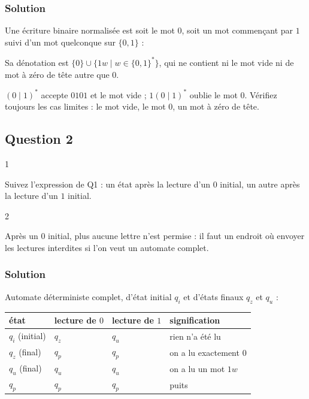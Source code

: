 \documentclass[11pt,a4paper]{article}
\newcommand{\equationajustee}[1]{%
  \sbox{\boiteequation}{$\displaystyle #1$}%
  \ifdim\wd\boiteequation>\linewidth
    \[\resizebox{\linewidth}{!}{\usebox{\boiteequation}}\]%
  \else
    \[#1\]%
  \fi}
\begin{document}
\hypertarget{solution}{%
\subsubsection{Solution}\label{solution}}

Une écriture binaire normalisée est soit le mot \(0\), soit un mot commençant par \(1\) suivi d'un mot quelconque sur \(\{0,1\}\) :

\equationajustee{\boxed{\,e = 0 \mid 1\,(0 \mid 1)^*\,}}

Sa dénotation est \(\{0\} \cup \{1w \mid w \in \{0,1\}^*\}\), qui ne contient ni le mot vide ni de mot à zéro de tête autre que \(0\).

\begin{piege}

\((0 \mid 1)^*\) accepte \(0101\) et le mot vide ; \(1(0 \mid 1)^*\) oublie le mot \(0\). Vérifiez toujours les cas limites : le mot vide, le mot \(0\), un mot à zéro de tête.

\end{piege}

\hypertarget{question-2}{%
\subsection{Question 2}\label{question-2}}

\begin{indication}{1}

Suivez l'expression de Q1 : un état après la lecture d'un \(0\) initial, un autre après la lecture d'un \(1\) initial.

\end{indication}

\begin{indication}{2}

Après un \(0\) initial, plus aucune lettre n'est permise : il faut un endroit où envoyer les lectures interdites si l'on veut un automate complet.

\end{indication}

\hypertarget{solution-1}{%
\subsubsection{Solution}\label{solution-1}}

Automate déterministe complet, d'état initial \(q_i\) et d'états finaux \(q_z\) et \(q_u\) :

\begin{longtable}[]{@{}llll@{}}
\toprule\noalign{}
état & lecture de \(0\) & lecture de \(1\) & signification \\
\midrule\noalign{}
\endhead
\bottomrule\noalign{}
\endlastfoot
\(q_i\) (initial) & \(q_z\) & \(q_u\) & rien n'a été lu \\
\(q_z\) (final) & \(q_p\) & \(q_p\) & on a lu exactement \(0\) \\
\(q_u\) (final) & \(q_u\) & \(q_u\) & on a lu un mot \(1w\) \\
\(q_p\) & \(q_p\) & \(q_p\) & puits \\
\end{longtable}
\end{document}
